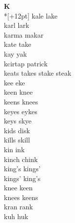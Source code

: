 \vspace{14pt}
\noindent\textbf{\Large K}\\*[+12pt]
kale lake\\
karl lark\\
karma makar\\
kate take\\
kay yak\\
kcirtap patrick\\
keats takes stake steak\\
kee eke\\
keen knee\\
keens knees\\
keyes eykes\\
keys skye\\
kids disk\\
kills skill\\
kin ink\\
kinch chink\\
king's kings'\\
kings' king's\\
knee keen\\
knees keens\\
kran rank\\
kuh huk\\

